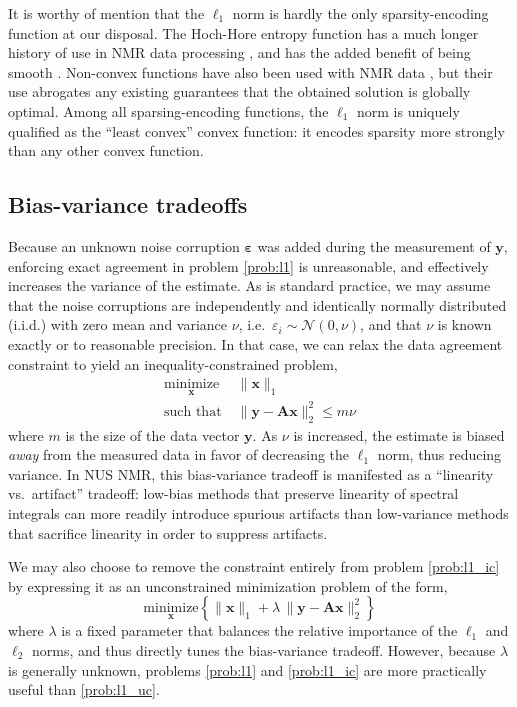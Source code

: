 \documentclass[final,5p,times,twocolumn]{elsarticle}
\newcommand{\m}[1]{\boldsymbol{#1}}
\begin{document}
It is worthy of mention that the $\ell_1$ norm is hardly the only
sparsity-encoding function at our disposal. The Hoch-Hore entropy function
has a much longer history of use in NMR data processing \cite{hoch:jmr2017},
and has the added benefit of being smooth \cite{worley:jmr2016}. Non-convex
functions have also been used with NMR data \cite{kazimierczuk:jmr2011,
 worley:cmr2018}, but their use abrogates any existing guarantees that
the obtained solution is globally optimal. Among all sparsing-encoding
functions, the $\ell_1$ norm is uniquely qualified as the ``least convex''
convex function: it encodes sparsity more strongly than any other convex
function.

\subsection{Bias-variance tradeoffs}
\label{ss:bv_trade}
Because an unknown noise corruption $\m{\varepsilon}$ was added during the
measurement of $\m{y}$, enforcing exact agreement in problem \eqref{prob:l1}
is unreasonable, and effectively increases the variance of the estimate. As
is standard practice, we may assume that the noise corruptions are
independently and identically normally distributed (i.i.d.) with zero mean
and variance $\nu$, i.e.~$\varepsilon_i \sim \mathcal{N}(0, \nu)$, and that
$\nu$ is known exactly or to reasonable precision. In that case, we can
relax the data agreement constraint to yield an inequality-constrained
problem,
\begin{equation}
\begin{aligned}
 \underset{\m{x}}{\text{minimize}} &\; \|\m{x}\|_1 \\
 \text{such that} &\; \| \m{y} - \m{A} \m{x} \|_2^2 \le m \nu
\end{aligned}
\label{prob:l1_ic}
\end{equation}
where $m$ is the size of the data vector $\m{y}$. As $\nu$ is increased,
the estimate is biased \emph{away} from the measured data in favor of
decreasing the $\ell_1$ norm, thus reducing variance. In NUS NMR, this
bias-variance tradeoff is manifested as a ``linearity vs.~artifact''
tradeoff: low-bias methods that preserve linearity of spectral integrals
can more readily introduce spurious artifacts than low-variance methods
that sacrifice linearity in order to suppress artifacts.

We may also choose to remove the constraint entirely from problem
\eqref{prob:l1_ic} by expressing it as an unconstrained minimization
problem of the form,
\begin{equation}
\underset{\m{x}}{\text{minimize}} \left\{
 \|\m{x}\|_1 + \lambda \, \| \m{y} - \m{A} \m{x} \|_2^2
 \right\}
\label{prob:l1_uc}
\end{equation}
where $\lambda$ is a fixed parameter that balances the relative importance
of the $\ell_1$ and $\ell_2$ norms, and thus directly tunes the
bias-variance tradeoff. However, because $\lambda$ is generally unknown,
problems \eqref{prob:l1} and \eqref{prob:l1_ic} are more practically
useful than \eqref{prob:l1_uc}.
\end{document}
